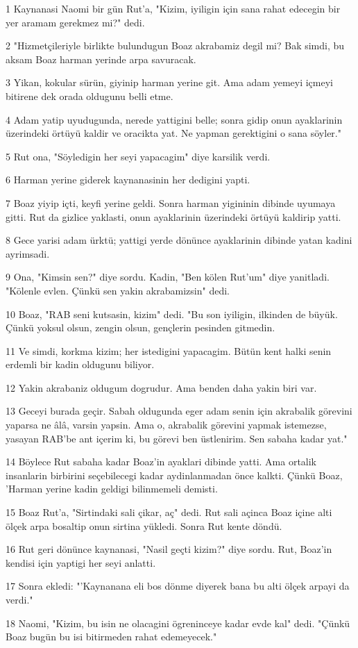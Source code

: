 \par 1 Kaynanasi Naomi bir gün Rut'a, "Kizim, iyiligin için sana rahat edecegin bir yer aramam gerekmez mi?" dedi.
\par 2 "Hizmetçileriyle birlikte bulundugun Boaz akrabamiz degil mi? Bak simdi, bu aksam Boaz harman yerinde arpa savuracak.
\par 3 Yikan, kokular sürün, giyinip harman yerine git. Ama adam yemeyi içmeyi bitirene dek orada oldugunu belli etme.
\par 4 Adam yatip uyudugunda, nerede yattigini belle; sonra gidip onun ayaklarinin üzerindeki örtüyü kaldir ve oracikta yat. Ne yapman gerektigini o sana söyler."
\par 5 Rut ona, "Söyledigin her seyi yapacagim" diye karsilik verdi.
\par 6 Harman yerine giderek kaynanasinin her dedigini yapti.
\par 7 Boaz yiyip içti, keyfi yerine geldi. Sonra harman yigininin dibinde uyumaya gitti. Rut da gizlice yaklasti, onun ayaklarinin üzerindeki örtüyü kaldirip yatti.
\par 8 Gece yarisi adam ürktü; yattigi yerde dönünce ayaklarinin dibinde yatan kadini ayrimsadi.
\par 9 Ona, "Kimsin sen?" diye sordu. Kadin, "Ben kölen Rut'um" diye yanitladi. "Kölenle evlen. Çünkü sen yakin akrabamizsin" dedi.
\par 10 Boaz, "RAB seni kutsasin, kizim" dedi. "Bu son iyiligin, ilkinden de büyük. Çünkü yoksul olsun, zengin olsun, gençlerin pesinden gitmedin.
\par 11 Ve simdi, korkma kizim; her istedigini yapacagim. Bütün kent halki senin erdemli bir kadin oldugunu biliyor.
\par 12 Yakin akrabaniz oldugum dogrudur. Ama benden daha yakin biri var.
\par 13 Geceyi burada geçir. Sabah oldugunda eger adam senin için akrabalik görevini yaparsa ne âlâ, varsin yapsin. Ama o, akrabalik görevini yapmak istemezse, yasayan RAB'be ant içerim ki, bu görevi ben üstlenirim. Sen sabaha kadar yat."
\par 14 Böylece Rut sabaha kadar Boaz'in ayaklari dibinde yatti. Ama ortalik insanlarin birbirini seçebilecegi kadar aydinlanmadan önce kalkti. Çünkü Boaz, 'Harman yerine kadin geldigi bilinmemeli demisti.
\par 15 Boaz Rut'a, "Sirtindaki sali çikar, aç" dedi. Rut sali açinca Boaz içine alti ölçek arpa bosaltip onun sirtina yükledi. Sonra Rut kente döndü.
\par 16 Rut geri dönünce kaynanasi, "Nasil geçti kizim?" diye sordu. Rut, Boaz'in kendisi için yaptigi her seyi anlatti.
\par 17 Sonra ekledi: "'Kaynanana eli bos dönme diyerek bana bu alti ölçek arpayi da verdi."
\par 18 Naomi, "Kizim, bu isin ne olacagini ögreninceye kadar evde kal" dedi. "Çünkü Boaz bugün bu isi bitirmeden rahat edemeyecek."


